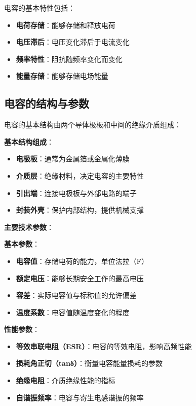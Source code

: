 \documentclass[12pt,UTF8]{ctexbook}
\begin{document}
电容的基本特性包括：
\begin{itemize}[leftmargin=3.5em]
    \item \textbf{电荷存储}：能够存储和释放电荷
    \item \textbf{电压滞后}：电压变化滞后于电流变化
    \item \textbf{频率特性}：阻抗随频率变化而变化
    \item \textbf{能量存储}：能够存储电场能量
\end{itemize}

\subsection{电容的结构与参数}

电容的基本结构由两个导体极板和中间的绝缘介质组成：

\textbf{基本结构组成}：
\begin{itemize}[leftmargin=3.5em]
    \item \textbf{电极板}：通常为金属箔或金属化薄膜
    \item \textbf{介质层}：绝缘材料，决定电容的主要特性
    \item \textbf{引出端}：连接电极板与外部电路的端子
    \item \textbf{封装外壳}：保护内部结构，提供机械支撑
\end{itemize}

\textbf{主要技术参数}：

\textbf{基本参数}：
\begin{itemize}[leftmargin=3.5em]
    \item \textbf{电容值}：存储电荷的能力，单位法拉（F）
    \item \textbf{额定电压}：能够长期安全工作的最高电压
    \item \textbf{容差}：实际电容值与标称值的允许偏差
    \item \textbf{温度系数}：电容值随温度变化的程度
\end{itemize}

\textbf{性能参数}：
\begin{itemize}[leftmargin=3.5em]
    \item \textbf{等效串联电阻（ESR）}：电容的等效电阻，影响高频性能
    \item \textbf{损耗角正切（tanδ）}：衡量电容能量损耗的参数
    \item \textbf{绝缘电阻}：介质绝缘性能的指标
    \item \textbf{自谐振频率}：电容与寄生电感谐振的频率
\end{itemize}
\end{document}
